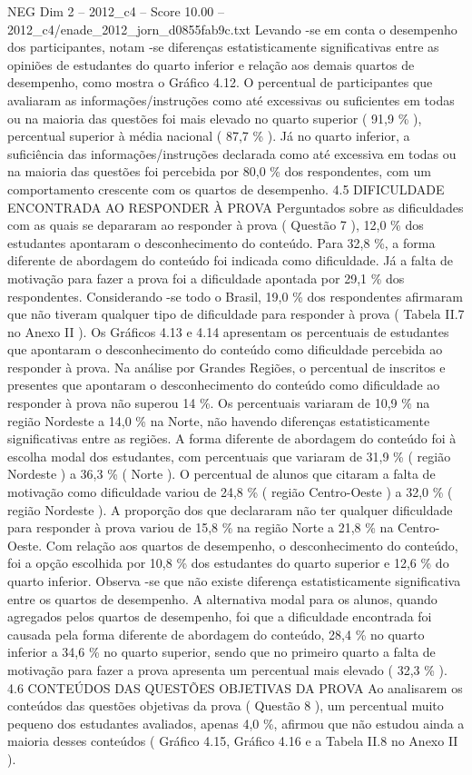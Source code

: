 \begin{textsample}{NEG Dim 2 – 2012\_c4 – Score 10.00 – 2012\_c4/enade\_2012\_jorn\_d0855fab9c.txt}
Levando -se em conta o desempenho dos participantes, notam -se diferenças estatisticamente significativas entre as opiniões de estudantes do quarto inferior e relação aos demais quartos de desempenho, como mostra o Gráfico 4.12.
O percentual de participantes que avaliaram as informações/instruções como até excessivas ou suficientes em todas ou na maioria das questões foi mais elevado no quarto superior ( 91,9 \% ), percentual superior à média nacional ( 87,7 \% ).
Já no quarto inferior, a suficiência das informações/instruções declarada como até excessiva em todas ou na maioria das questões foi percebida por 80,0 \% dos respondentes, com um comportamento crescente com os quartos de desempenho. 4.5 DIFICULDADE ENCONTRADA AO RESPONDER À PROVA Perguntados sobre as dificuldades com as quais se depararam ao responder à prova ( Questão 7 ), 12,0 \% dos estudantes apontaram o desconhecimento do conteúdo.
Para 32,8 \%, a forma diferente de abordagem do conteúdo foi indicada como dificuldade.
Já a falta de motivação para fazer a prova foi a dificuldade apontada por 29,1 \% dos respondentes.
Considerando -se todo o Brasil, 19,0 \% dos respondentes afirmaram que não tiveram qualquer tipo de dificuldade para responder à prova ( Tabela II.7 no Anexo II ).
Os Gráficos 4.13 e 4.14 apresentam os percentuais de estudantes que apontaram o desconhecimento do conteúdo como dificuldade percebida ao responder à prova.
Na análise por Grandes Regiões, o percentual de inscritos e presentes que apontaram o desconhecimento do conteúdo como dificuldade ao responder à prova não superou 14 \%.
Os percentuais variaram de 10,9 \% na região Nordeste a 14,0 \% na Norte, não havendo diferenças estatisticamente significativas entre as regiões.
A forma diferente de abordagem do conteúdo foi à escolha modal dos estudantes, com percentuais que variaram de 31,9 \% ( região Nordeste ) a 36,3 \% ( Norte ).
O percentual de alunos que citaram a falta de motivação como dificuldade variou de 24,8 \% ( região Centro-Oeste ) a 32,0 \% ( região Nordeste ).
A proporção dos que declararam não ter qualquer dificuldade para responder à prova variou de 15,8 \% na região Norte a 21,8 \% na Centro-Oeste.
Com relação aos quartos de desempenho, o desconhecimento do conteúdo, foi a opção escolhida por 10,8 \% dos estudantes do quarto superior e 12,6 \% do quarto inferior.
Observa -se que não existe diferença estatisticamente significativa entre os quartos de desempenho.
A alternativa modal para os alunos, quando agregados pelos quartos de desempenho, foi que a dificuldade encontrada foi causada pela forma diferente de abordagem do conteúdo, 28,4 \% no quarto inferior a 34,6 \% no quarto superior, sendo que no primeiro quarto a falta de motivação para fazer a prova apresenta um percentual mais elevado ( 32,3 \% ). 4.6 CONTEÚDOS DAS QUESTÕES OBJETIVAS DA PROVA Ao analisarem os conteúdos das questões objetivas da prova ( Questão 8 ), um percentual muito pequeno dos estudantes avaliados, apenas 4,0 \%, afirmou que não estudou ainda a maioria desses conteúdos ( Gráfico 4.15, Gráfico 4.16 e a Tabela II.8 no Anexo II ).

\end{textsample}
